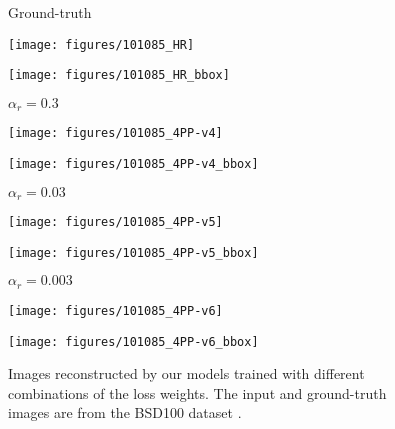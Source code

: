 \documentclass[runningheads]{llncs}
\begin{document}
\begin{figure}[t!]
	\centering
	\begin{minipage}[b]{0.24\linewidth}
		\centering
		\centerline{\scriptsize{Ground-truth}}\medskip
		\centerline{\texttt{[image: figures/101085\_HR]}}\smallskip
		\centerline{\texttt{[image: figures/101085\_HR\_bbox]}}
	\end{minipage}
	\begin{minipage}[b]{0.24\linewidth}
		\centering
		\centerline{\scriptsize{${\alpha}_{r} = 0.3$}}\medskip
		\centerline{\texttt{[image: figures/101085\_4PP-v4]}}\smallskip
		\centerline{\texttt{[image: figures/101085\_4PP-v4\_bbox]}}
	\end{minipage}
	\begin{minipage}[b]{0.24\linewidth}
		\centering
		\centerline{\scriptsize{${\alpha}_{r} = 0.03$}}\medskip
		\centerline{\texttt{[image: figures/101085\_4PP-v5]}}\smallskip
		\centerline{\texttt{[image: figures/101085\_4PP-v5\_bbox]}}
	\end{minipage}
	\begin{minipage}[b]{0.24\linewidth}
		\centering
		\centerline{\scriptsize{${\alpha}_{r} = 0.003$}}\medskip
		\centerline{\texttt{[image: figures/101085\_4PP-v6]}}\smallskip
		\centerline{\texttt{[image: figures/101085\_4PP-v6\_bbox]}}
	\end{minipage}
	\caption{Images reconstructed by our models trained with different combinations of the loss weights. The input and ground-truth images are from the BSD100 dataset \cite{martin2001database}.}
	\label{fig:result_loss_weight_comparison}
\end{figure}
\end{document}
